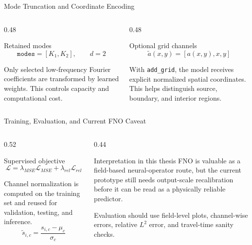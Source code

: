 \documentclass[aspectratio=169,10pt]{beamer}
\begin{document}
\begin{frame}{Mode Truncation and Coordinate Encoding}
  \begin{columns}[T]
    \begin{column}{0.48\textwidth}
      \begin{block}{Retained modes}
        \[
          \texttt{modes}=[K_1,K_2],\qquad d=2
        \]
      \end{block}
      \footnotesize
      Only selected low-frequency Fourier coefficients are transformed by
      learned weights. This controls capacity and computational cost.
    \end{column}
    \begin{column}{0.48\textwidth}
      \begin{block}{Optional grid channels}
        \[
          \tilde{a}(x,y)=[a(x,y),x,y]
        \]
      \end{block}
      \footnotesize
      With \texttt{add\_grid}, the model receives explicit normalized spatial
      coordinates. This helps distinguish source, boundary, and interior regions.
    \end{column}
  \end{columns}
\end{frame}

\begin{frame}{Training, Evaluation, and Current FNO Caveat}
  \begin{columns}[T]
    \begin{column}{0.52\textwidth}
      \begin{block}{Supervised objective}
        \[
          \mathcal{L}=\lambda_{MSE}\mathcal{L}_{MSE}
          +\lambda_{rel}\mathcal{L}_{rel}
        \]
      \end{block}
      \scriptsize
      Channel normalization is computed on the training set and reused for
      validation, testing, and inference.
      \[
        \tilde{s}_{i,c}=\frac{s_{i,c}-\mu_c}{\sigma_c}
      \]
    \end{column}
    \begin{column}{0.44\textwidth}
      \begin{alertblock}{Interpretation in this thesis}
        \footnotesize
        FNO is valuable as a field-based neural-operator route, but the current
        prototype still needs output-scale recalibration before it can be read
        as a physically reliable predictor.
      \end{alertblock}
      \footnotesize
      Evaluation should use field-level plots, channel-wise errors, relative
      $L^2$ error, and travel-time sanity checks.
    \end{column}
  \end{columns}
\end{frame}
\end{document}
